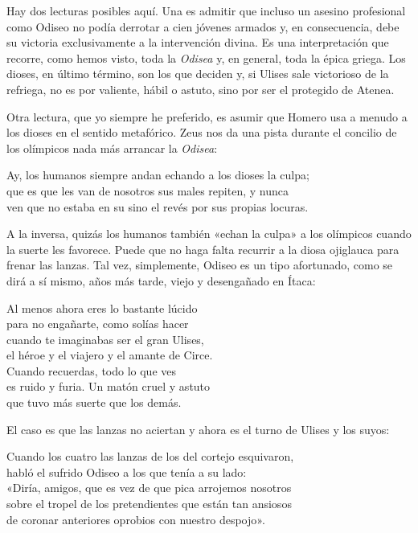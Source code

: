 Hay dos lecturas posibles aquí. Una es admitir que incluso un asesino profesional como Odiseo no podía derrotar a cien jóvenes armados y, en consecuencia, debe su victoria exclusivamente a la intervención divina. Es una interpretación que recorre, como hemos visto, toda la \emph{Odisea} y, en general, toda la épica griega. Los dioses, en último término, son los que deciden y, si Ulises sale victorioso de la refriega, no es por valiente, hábil o astuto, sino por ser el protegido de Atenea.

Otra lectura, que yo siempre he preferido, es asumir que Homero usa a menudo a los dioses en el sentido metafórico. Zeus nos da una pista durante el concilio de los olímpicos nada más arrancar la \emph{Odisea}:

\begin{versocita}
Ay, los humanos siempre andan echando a los dioses la culpa;\\
que es que les van de nosotros sus males repiten, y nunca\\
ven que no estaba en su sino el revés por sus propias locuras.
\end{versocita}

A la inversa, quizás los humanos también «echan la culpa» a los olímpicos cuando la suerte les favorece. Puede que no haga falta recurrir a la diosa ojiglauca para frenar las lanzas. Tal vez, simplemente, Odiseo es un tipo afortunado, como se dirá a sí mismo, años más tarde, viejo y desengañado en Ítaca:

\begin{versopropio}
Al menos ahora eres lo bastante lúcido\\
para no engañarte, como solías hacer\\
cuando te imaginabas ser el gran Ulises,\\
el héroe y el viajero y el amante de Circe.\\
Cuando recuerdas, todo lo que ves\\
es ruido y furia. Un matón cruel y astuto\\
que tuvo más suerte que los demás.
\end{versopropio}

El caso es que las lanzas no aciertan y ahora es el turno de Ulises y los suyos:

\begin{versocita}
Cuando los cuatro las lanzas de los del cortejo esquivaron,\\
habló el sufrido Odiseo a los que tenía a su lado:\\
«Diría, amigos, que es vez de que pica arrojemos nosotros\\
sobre el tropel de los pretendientes que están tan ansiosos\\
de coronar anteriores oprobios con nuestro despojo».
\end{versocita}

